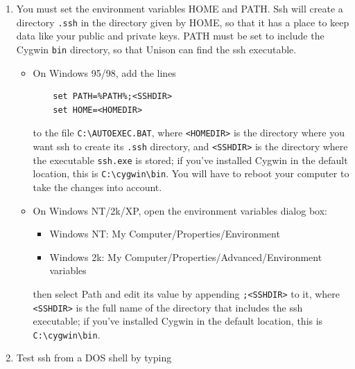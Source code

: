 \documentclass{article}
\begin{document}
\begin{enumerate}
\begin{enumerate}
  After the packages are downloaded and installed, the next dialog
  allows you to choose whether to ``Create Desktop Icon'' and ``Add to
  Start Menu.''  You make the call.
\item You can now delete the directory \verb|Foo| and its contents.
\end{enumerate}
Some people have reported problems using Cygwin's ssh with Unison.  If
you have trouble, you might try other ones instead:
\begin{verbatim}
  http://linuxmafia.com/ssh/win32.html
\end{verbatim}

\item You must set the environment variables HOME and PATH\@.
  Ssh will create a directory \verb|.ssh| in the directory given
  by HOME, so that it has a place to keep data like your public and
  private keys.  PATH must be set to include the Cygwin \verb|bin|
  directory, so that Unison can find the ssh executable.
  \begin{itemize}
  \item
    On Windows 95/98, add the lines
\begin{verbatim}
    set PATH=%PATH%;<SSHDIR>
    set HOME=<HOMEDIR>
\end{verbatim}
    to the file \verb|C:\AUTOEXEC.BAT|, where \verb|<HOMEDIR>| is the
    directory where you want ssh to create its \verb|.ssh| directory,
    and \verb|<SSHDIR>| is the directory where the executable
    \verb|ssh.exe| is stored; if you've installed Cygwin in the
    default location, this is \verb|C:\cygwin\bin|.  You will have to
    reboot your computer to take the changes into account.
  \item On Windows NT/2k/XP, open the environment variables dialog box:
    \begin{itemize}
    \item Windows NT: My Computer/Properties/Environment
    \item Windows 2k: My Computer/Properties/Advanced/Environment
      variables
    \end{itemize}
    then select Path and edit its value by appending \verb|;<SSHDIR>|
    to it, where \verb|<SSHDIR>| is the full name of the directory
    that includes the ssh executable; if you've installed Cygwin in
    the default location, this is \verb|C:\cygwin\bin|.
  \end{itemize}
  \item Test ssh from a DOS shell by typing
\begin{verbatim}

\end{verbatim}
\end{enumerate}
\end{document}
